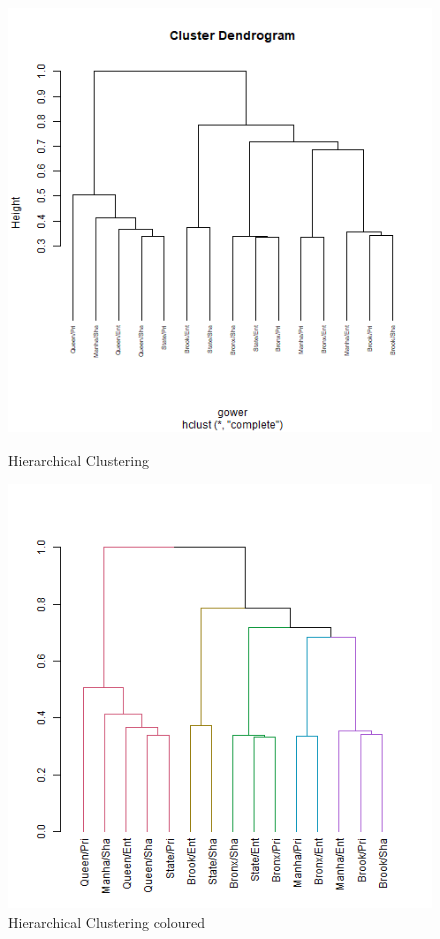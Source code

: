 \documentclass{FR16}
\begin{document}
\begin{figure}[!htb]
   \begin{minipage}{0.48\textwidth}
     \centering
    \includegraphics[width=1\textwidth]{figures/hc.PNG} 
 \caption{\label{fig:26} Hierarchical Clustering}
   \end{minipage}\hfill
   \begin{minipage}{0.48\textwidth}
     \centering
       \includegraphics[width=1\textwidth]{figures/hc2.PNG} 
 \caption{\label{fig:27} Hierarchical Clustering coloured }
   \end{minipage}
   
\end{figure}
\end{document}
